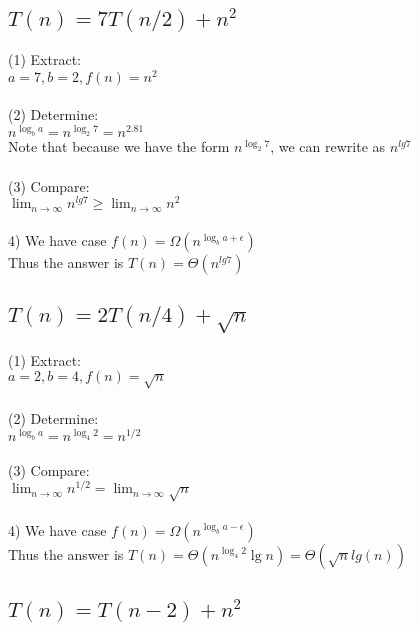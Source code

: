 \documentclass[20pt]{article} %
\begin{document}
\subsection{$T(n) = 7T(n/2) + n^{2}$}

(1) Extract:
\\ \indent $a = 7, b = 2, f(n) = n^{2}$ 
\\ \\
(2) Determine:
\\ \indent $n^{\log_b a} = n^{\log_2 7} = n^{2.81}$
\\
Note that because we have the form $n^{\log_2 7}$, we can rewrite as $n^{lg 7}$
\\ \\
(3) Compare:
\\ \indent  $\lim_{n\to\infty} n^{lg 7} \geq \lim_{n\to\infty}n^{2}$
\\ \\
4) We have case $f(n) = \Omega(n^{\log_b a + \epsilon})$
\\ Thus the answer is $T(n) = \Theta(n^{lg 7})$

\subsection{$T(n) = 2T(n/4) + \sqrt{n}$}

(1) Extract:
\\ \indent $a = 2, b = 4, f(n) = \sqrt{n}$ 
\\ \\
(2) Determine:
\\ \indent $n^{\log_b a} = n^{\log_4 2} = n^{1/2}$
\\ \\
(3) Compare:
\\ \indent  $\lim_{n\to\infty} n^{1/2} = \lim_{n\to\infty}\sqrt{n}$
\\ \\
4) We have case $f(n) = \Omega(n^{\log_b a - \epsilon})$
\\ Thus the answer is $T(n) = \Theta(n^{\log_4 2}\lg n) = \Theta(\sqrt{n}lg(n))$

\newpage
\subsection{$T(n) = T(n-2) + n^{2}$}
\end{document}
